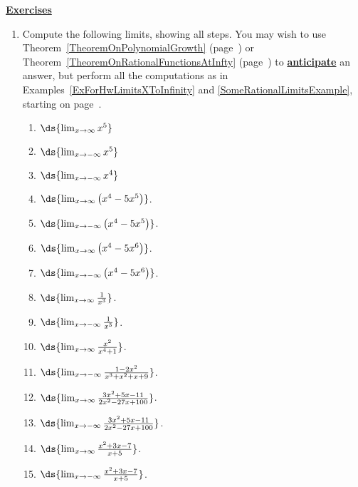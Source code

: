 \begin{center}
\underline{\Large{\bf Exercises}}\end{center}
\begin{multicols}{2}
\begin{enumerate}
\item Compute the following limits, showing all steps.
You may wish to use 
Theorem~\ref{TheoremOnPolynomialGrowth} 
(page~\pageref{TheoremOnPolynomialGrowth})
or Theorem~\ref{TheoremOnRationalFunctionsAtInfty}
(page~\pageref{TheoremOnRationalFunctionsAtInfty}) 
to \underline{\bf anticipate}
an answer, but perform all the computations as in 
Examples~\ref{ExForHwLimitsXToInfinity} and \ref{SomeRationalLimitsExample},
starting on page~\pageref{SomeRationalLimitsExample}.
 \begin{enumerate}
 \item $\ds{\lim_{x\to\infty}x^5}$
 \item $\ds{\lim_{x\to-\infty}x^5}$
 \item $\ds{\lim_{x\to-\infty}x^4}$
 \item $\ds{\lim_{x\to\infty}\left(x^4-5x^5\right)}$.
 \item $\ds{\lim_{x\to-\infty}\left(x^4-5x^5\right)}$.
 \item $\ds{\lim_{x\to\infty}\left(x^4-5x^6\right)}$.
 \item $\ds{\lim_{x\to-\infty}\left(x^4-5x^6\right)}$.
 \item $\ds{\lim_{x\to\infty}\frac{1}{x^3}}$.
 \item $\ds{\lim_{x\to-\infty}\frac1{x^3}}$.
 \item $\ds{\lim_{x\to\infty}\frac{x^2}{x^4+1}}$.
 \item $\ds{\lim_{x\to-\infty}\frac{1-2x^2}{x^3+x^2+x+9}}$.
 \item $\ds{\lim_{x\to\infty}\frac{3x^2+5x-11}{2x^2-27x+100}}$.
 \item $\ds{\lim_{x\to-\infty}\frac{3x^2+5x-11}{2x^2-27x+100}}$.
 \item $\ds{\lim_{x\to\infty}\frac{x^2+3x-7}{x+5}}$.
 \item $\ds{\lim_{x\to-\infty}\frac{x^2+3x-7}{x+5}}$.


\end{enumerate}
\end{enumerate}
\end{multicols}
